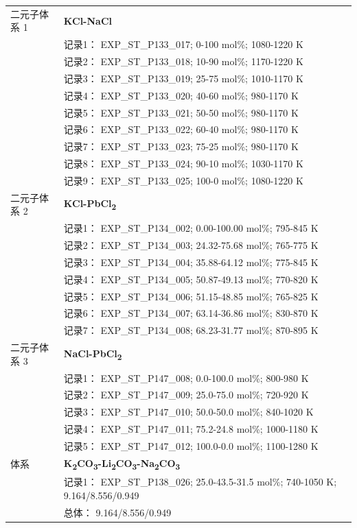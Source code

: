 \documentclass[12pt]{article}
\begin{document}
{\begin{longtable}[]{@{}
  >{\raggedright\arraybackslash}p{}
  >{\raggedright\arraybackslash}p{}@{}}
二元子体系 1  & \textbf{KCl-NaCl} \\
 & 记录1： EXP\_ST\_P133\_017; 0-100 mol\%; 1080-1220 K \\
 & 记录2： EXP\_ST\_P133\_018; 10-90 mol\%; 1170-1220 K \\
 & 记录3： EXP\_ST\_P133\_019; 25-75 mol\%; 1010-1170 K \\
 & 记录4： EXP\_ST\_P133\_020; 40-60 mol\%; 980-1170 K \\
 & 记录5： EXP\_ST\_P133\_021; 50-50 mol\%; 980-1170 K \\
 & 记录6： EXP\_ST\_P133\_022; 60-40 mol\%; 980-1170 K \\
 & 记录7： EXP\_ST\_P133\_023; 75-25 mol\%; 980-1170 K \\
 & 记录8： EXP\_ST\_P133\_024; 90-10 mol\%; 1030-1170 K \\
 & 记录9： EXP\_ST\_P133\_025; 100-0 mol\%; 1080-1220 K  \\

二元子体系 2  & \textbf{KCl-PbCl\textsubscript{2}} \\
 & 记录1： EXP\_ST\_P134\_002; 0.00-100.00 mol\%; 795-845 K \\
 & 记录2： EXP\_ST\_P134\_003; 24.32-75.68 mol\%; 765-775 K \\
 & 记录3： EXP\_ST\_P134\_004; 35.88-64.12 mol\%; 775-845 K \\
 & 记录4： EXP\_ST\_P134\_005; 50.87-49.13 mol\%; 770-820 K \\
 & 记录5： EXP\_ST\_P134\_006; 51.15-48.85 mol\%; 765-825 K \\
 & 记录6： EXP\_ST\_P134\_007; 63.14-36.86 mol\%; 830-870 K \\
 & 记录7： EXP\_ST\_P134\_008; 68.23-31.77 mol\%; 870-895 K  \\

二元子体系 3  & \textbf{NaCl-PbCl\textsubscript{2}} \\
 & 记录1： EXP\_ST\_P147\_008; 0.0-100.0 mol\%; 800-980 K \\
 & 记录2： EXP\_ST\_P147\_009; 25.0-75.0 mol\%; 720-920 K \\
 & 记录3： EXP\_ST\_P147\_010; 50.0-50.0 mol\%; 840-1020 K \\
 & 记录4： EXP\_ST\_P147\_011; 75.2-24.8 mol\%; 1000-1180 K \\
 & 记录5： EXP\_ST\_P147\_012; 100.0-0.0 mol\%; 1100-1280 K  \\

\midrule
体系 & \textbf{K\textsubscript{2}CO\textsubscript{3}-Li\textsubscript{2}CO\textsubscript{3}-Na\textsubscript{2}CO\textsubscript{3}} \\
 & 记录1： EXP\_ST\_P138\_026; 25.0-43.5-31.5 mol\%; 740-1050 K; 9.164/8.556/0.949 \\
 & 总体： 9.164/8.556/0.949  \\


\end{longtable}}
\end{document}

